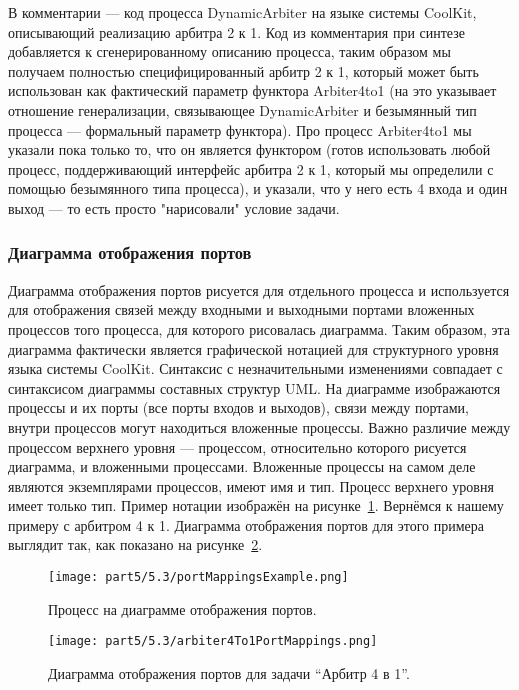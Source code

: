 В комментарии --- код процесса DynamicArbiter на языке системы CoolKit, описывающий 
реализацию арбитра 2 к 1. Код из комментария при синтезе добавляется к сгенерированному 
описанию процесса, таким образом мы получаем полностью специфицированный арбитр 2 к 1, 
который может быть использован как фактический параметр функтора Arbiter4to1 (на это 
указывает отношение генерализации, связывающее DynamicArbiter и безымянный тип процесса --- 
формальный параметр функтора). Про процесс Arbiter4to1 мы указали пока только то, 
что он является функтором (готов использовать любой процесс, поддерживающий интерфейс 
арбитра 2 к 1, который мы определили с помощью безымянного типа процесса), и указали, 
что у него есть 4 входа и один выход --- то есть просто "нарисовали" условие задачи.

\subsubsection{Диаграмма отображения портов}
Диаграмма отображения портов рисуется для отдельного процесса и используется для отображения 
связей между входными и выходными портами вложенных процессов того процесса, для которого 
рисовалась диаграмма. Таким образом, эта диаграмма фактически является графической 
нотацией для структурного уровня языка системы CoolKit. Синтаксис с незначительными 
изменениями совпадает с синтаксисом диаграммы составных структур UML. На диаграмме 
изображаются процессы и их порты (все порты входов и выходов), связи между портами, 
внутри процессов могут находиться вложенные процессы. Важно различие между процессом 
верхнего уровня --- процессом, относительно которого рисуется диаграмма, и вложенными 
процессами. Вложенные процессы на самом деле являются экземплярами процессов, имеют 
имя и тип. Процесс верхнего уровня имеет только тип. Пример нотации изображён на рисунке~\ref{image:portMappingsExample}. 
Вернёмся к нашему примеру с арбитром 4 к 1. Диаграмма отображения портов для этого примера 
выглядит так, как показано на рисунке~\ref{image:arbiter4To1PortMappings}.

\begin{figure} [ht]
	\begin{center}
		\texttt{[image: part5/5.3/portMappingsExample.png]}
		\caption{Процесс на диаграмме отображения портов.}
		\label{image:portMappingsExample}
	\end{center}
\end{figure}

\begin{figure} [ht]
	\begin{center}
		\texttt{[image: part5/5.3/arbiter4To1PortMappings.png]}
		\caption{Диаграмма отображения портов для задачи "`Арбитр 4 в 1"'.}
		\label{image:arbiter4To1PortMappings}
	\end{center}
\end{figure}

